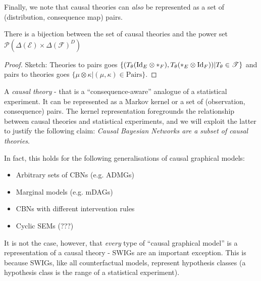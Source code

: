 Finally, we note that causal theories can \emph{also} be represented as a set of (distribution, consequence map) pairs.

\begin{theorem}
There is a bijection between the set of causal theories and the power set $\mathscr{P}(\Delta(\mathcal{E})\times \Delta(\mathcal{F})^D)$
\end{theorem}

\begin{proof}
Sketch: Theories to pairs goes $\{(T_\theta (\text{Id}_{E}\otimes *_F),T_\theta (*_E\otimes \text{Id}_{F}))|T_\theta\in \mathscr{T}\}$ and pairs to theories goes $\{\mu\otimes \kappa|(\mu,\kappa)\in \mathrm{Pairs}\}$.
\end{proof}

A \emph{causal theory} - that is a ``consequence-aware'' analogue of a statistical experiment. It can be represented as a Markov kernel or a set of (observation, consequence) pairs. The kernel representation foregrounds the relationship between causal theories and statistical experiments, and we will exploit the latter to justify the following claim: \emph{Causal Bayesian Networks are a subset of causal theories}.

In fact, this holds for the following generalisations of causal graphical models:
\begin{itemize}
\item Arbitrary sets of CBNs (e.g. ADMGs)
\item Marginal models (e.g. mDAGs)
\item CBNs with different intervention rules
\item Cyclic SEMs (???)
\end{itemize}


It is not the case, however, that \emph{every} type of ``causal graphical model'' is a representation of a causal theory - SWIGs are an important exception. This is because SWIGs, like all counterfactual models, represent hypothesis classes (a hypothesis class is the range of a statistical experiment).

